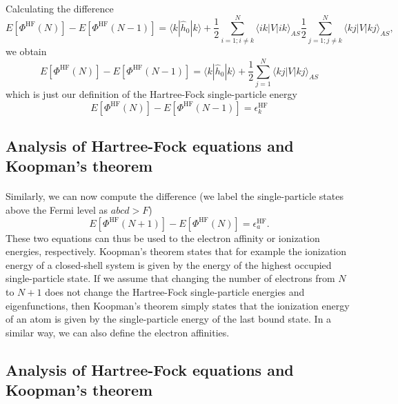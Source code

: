 \documentclass[%
twoside,                 %
final,                   %
10pt]{article}
\begin{document}
\paragraph{}
Calculating the difference 
\[
  E[\Phi^{\mathrm{HF}}(N)]-   E[\Phi^{\mathrm{HF}}(N-1)] = \langle k | \hat{h}_0 | k \rangle +
  \frac{1}{2}\sum_{i=1;i\ne k}^N\langle ik|V|ik\rangle_{AS}  \frac{1}{2}\sum_{j=1;j\ne k}^N\langle kj|V|kj\rangle_{AS},
\]
we obtain
\[
  E[\Phi^{\mathrm{HF}}(N)]-   E[\Phi^{\mathrm{HF}}(N-1)] = \langle k | \hat{h}_0 | k \rangle +
  \frac{1}{2}\sum_{j=1}^N\langle kj|V|kj\rangle_{AS}
\]
which is just our definition of the Hartree-Fock single-particle energy
\[
  E[\Phi^{\mathrm{HF}}(N)]-   E[\Phi^{\mathrm{HF}}(N-1)] = \epsilon_k^{\mathrm{HF}} 
\]



\subsection*{Analysis of Hartree-Fock equations and Koopman's theorem}

\paragraph{}
Similarly, we can now compute the difference (we label the single-particle states above the Fermi level as $abcd > F$)
\[
  E[\Phi^{\mathrm{HF}}(N+1)]-   E[\Phi^{\mathrm{HF}}(N)]= \epsilon_a^{\mathrm{HF}}. 
\]
These two equations can thus be used to the electron affinity or ionization energies, respectively. 
Koopman's theorem states that for example the ionization energy of a closed-shell system is given by the energy of the highest occupied single-particle state.  If we assume that changing the number of electrons from $N$ to $N+1$ does not change the Hartree-Fock single-particle energies and eigenfunctions, then Koopman's theorem simply states that the ionization energy of an atom is given by the single-particle energy of the last bound state. In a similar way, we can also define the electron affinities.



\subsection*{Analysis of Hartree-Fock equations and Koopman's theorem}

\end{document}

